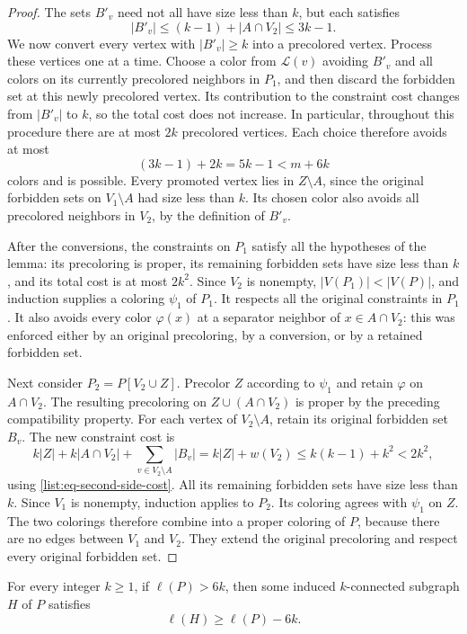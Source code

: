 \begin{proof}
The sets $B'_v$ need not all have size less than $k$, but each satisfies
\[
|B'_v|\le(k-1)+|A\cap V_2|\le3k-1.
\]
We now convert every vertex with $|B'_v|\ge k$ into a precolored vertex.
Process these vertices one at a time. Choose a color from $\mathcal L(v)$
avoiding $B'_v$ and all colors on its currently precolored neighbors in
$P_1$, and then discard the forbidden set at this newly precolored vertex.
Its contribution to the constraint cost changes from $|B'_v|$ to $k$, so
the total cost does not increase. In particular, throughout this procedure
there are at most $2k$ precolored vertices. Each choice therefore avoids
at most
\[
(3k-1)+2k=5k-1<m+6k
\]
colors and is possible. Every promoted vertex lies in $Z\setminus A$,
since the original forbidden sets on $V_1\setminus A$ had size less than
$k$. Its chosen color also avoids all precolored neighbors in $V_2$, by
the definition of $B'_v$.

After the conversions, the constraints on $P_1$ satisfy all the hypotheses
of the lemma: its precoloring is proper, its remaining forbidden sets have
size less than $k$, and its total cost is at most $2k^2$.
Since $V_2$ is nonempty, $|V(P_1)|<|V(P)|$, and induction supplies a
coloring $\psi_1$ of $P_1$. It respects all the original constraints in
$P_1$. It also avoids every color $\varphi(x)$ at a separator neighbor of
$x\in A\cap V_2$: this was enforced either by an original precoloring,
by a conversion, or by a retained forbidden set.

Next consider $P_2=P[V_2\cup Z]$. Precolor $Z$ according to $\psi_1$ and
retain $\varphi$ on $A\cap V_2$. The resulting precoloring on
$Z\cup(A\cap V_2)$ is proper by the preceding compatibility property.
For each vertex of $V_2\setminus A$, retain its original forbidden set
$B_v$. The new constraint cost is
\[
k|Z|+k|A\cap V_2|+
\sum_{v\in V_2\setminus A}|B_v|
=k|Z|+w(V_2)
\le k(k-1)+k^2<2k^2,
\]
using \eqref{list:eq-second-side-cost}. All its remaining forbidden sets
have size less than $k$. Since $V_1$ is nonempty, induction applies to
$P_2$. Its coloring agrees with $\psi_1$ on $Z$. The two colorings therefore
combine into a proper coloring of $P$, because there are no edges between
$V_1$ and $V_2$. They extend the original precoloring and respect every
original forbidden set.
\end{proof}

\begin{lemma}\label{lem:list-extraction}
For every integer $k\ge1$, if $\ell(P)>6k$, then some induced
$k$-connected subgraph $H$ of $P$ satisfies
\[
\ell(H)\ge\ell(P)-6k.
\]
\end{lemma}

